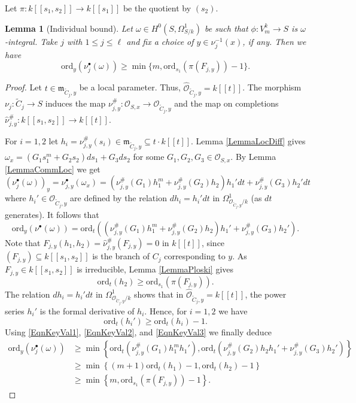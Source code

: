 \documentclass[11pt]{amsart}
\newtheorem{lemma}[theorem]{Lemma}
\theoremstyle{remark}
\numberwithin{equation}{section}
\newcommand{\mfrak}{\mathfrak{m}}
\newcommand{\Ocal}{\mathscr{O}}
\newcommand{\ord}{\mathrm{ord}}
\begin{document}
Let $\pi:k[[s_1,s_2]]\to k[[s_1]]$ be the quotient by $(s_2)$. 

\begin{lemma}[Individual bound] \label{LemmaIndividual} Let $\omega\in H^0(S,\Omega^1_{S/k})$ be such that $\phi:V_m^k\to S$ is $\omega$-integral. Take $j$ with $1\le j\le \ell$ and fix a choice of $y\in \nu_j^{-1}(x)$, if any. Then we have
$$
\ord_y (\nu_j^\bullet(\omega))\ge \min\{m, \ord_{s_1}(\pi(F_{j,y})) -1\}.
$$
\end{lemma}
\begin{proof} Let $t\in \mfrak_{\widetilde{C}_j, y}$ be a local parameter. Thus, $\widehat{\Ocal}_{\widetilde{C}_j,y}=k[[t]]$. The morphism $\nu_{j}:\widetilde{C}_j\to S$ induces the map $\nu_{j,y}^\#: \Ocal_{S,x}\to \Ocal_{\widetilde{C}_j,y}$ and the map on completions $\widehat{\nu}_{j,y}^\#:k[[s_1,s_2]]\to k[[t]]$. 

For $i=1,2$ let $h_i=\nu_{j,y}^\#(s_i)\in \mfrak_{\widetilde{C}_j,y}\subseteq t\cdot k[[t]]$. Lemma \ref{LemmaLocDiff} gives $\omega_x=(G_1s_1^m + G_2s_2)ds_1 + G_3ds_2$ for some $G_1,G_2,G_3\in \Ocal_{S,x}$. By Lemma \ref{LemmaCommLoc} we get
$$
(\nu_j^\bullet(\omega))_y = \nu_{j,y}^\bullet(\omega_x) = \left(\nu_{j,y}^\#(G_1)h_1^m +\nu_{j,y}^\#(G_2)h_2\right)h_1'dt + \nu_{j,y}^\#(G_3)h_2'dt
$$
where $h_i'\in \Ocal_{\widetilde{C}_j,y}$ are defined by the relation $dh_i=h_i'dt$ in $\Omega^1_{\Ocal_{\widetilde{C}_j,y}/k}$ (as $dt$ generates). It follows that
\begin{equation}\label{EqnKeyVal1}
\ord_y(\nu^\bullet(\omega)) = \ord_t\left((\nu_{j,y}^\#(G_1)h_1^m +\nu_{j,y}^\#(G_2)h_2)h_1' + \nu_{j,y}^\#(G_3)h_2'\right).
\end{equation}
Note that $F_{j,y}(h_1,h_2)=\widehat{\nu}_{j,y}^\#(F_{j,y})=0$ in $k[[t]]$, since $(F_{j,y})\subseteq k[[s_1,s_2]]$ is the branch of $C_j$ corresponding to $y$. As $F_{j,y}\in k[[s_1,s_2]]$ is irreducible, Lemma \ref{LemmaPloski} gives 
\begin{equation}\label{EqnKeyVal2}
\ord_t (h_2) \ge \ord_{s_1} (\pi(F_{j,y})).
\end{equation}
The relation $dh_i=h_i'dt$ in $\Omega^1_{\Ocal_{\widetilde{C}_j,y}/k}$  shows that in $\widehat{\Ocal}_{\widetilde{C}_j,y}=k[[t]]$, the power series $h_i'$ is the formal derivative of $h_i$. Hence, for $i=1,2$ we have
\begin{equation}\label{EqnKeyVal3}
\ord_t (h_i') \ge \ord_t (h_i)-1.
\end{equation}
Using \eqref{EqnKeyVal1}, \eqref{EqnKeyVal2}, and \eqref{EqnKeyVal3} we finally deduce
$$
\begin{aligned}
\ord_y(\nu_j^\bullet(\omega))&\ge \min\left\{ \ord_t\left(\nu_{j,y}^\#(G_1)h_1^mh_1' \right), \ord_t\left(  \nu_{j,y}^\#(G_2)h_2h_1' + \nu_{j,y}^\#(G_3)h_2'  \right)   \right\} \\
& \ge \min\left\{ (m+1) \ord_t(h_1) -1, \ord_t(h_2)-1   \right\} \\
& \ge \min\left\{  m , \ord_{s_1}(\pi(F_{j,y}))-1  \right\}.
\end{aligned}
$$
\end{proof}
\end{document}
